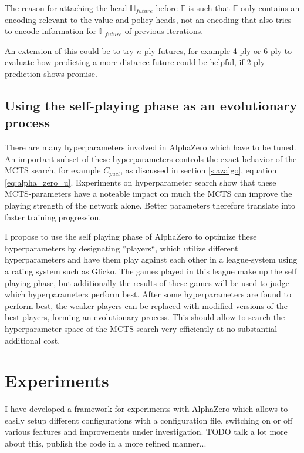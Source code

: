 \documentclass[12pt,onecolumn,oneside,titlepage]{article}
\begin{document}
The reason for attaching the head $\mathbb{H}_{future}$ before $\mathbb{F}$ is such that $\mathbb{F}$ only contains an encoding relevant to the value and policy heads, not an encoding that also tries to encode information for $\mathbb{H}_{future}$ of previous iterations.

An extension of this could be to try $n$-ply futures, for example 4-ply or 6-ply to evaluate how predicting a more distance future could be helpful, if 2-ply prediction shows promise.

\subsection{Using the self-playing phase as an evolutionary process}

There are many hyperparameters involved in AlphaZero which have to be tuned. An important subset of these hyperparameters controls the exact behavior of the MCTS search, for example $C_{puct}$, as discussed in section \ref{s:azalgo}, equation \ref{eq:alpha_zero_u}.
Experiments on hyperparameter search show that these MCTS-parameters have a noteable impact on much the MCTS can improve the playing strength of the network alone. Better parameters therefore translate into faster training progression.

I propose to use the self playing phase of AlphaZero to optimize these hyperparameters by designating ''players``, which utilize different hyperparameters and have them play against each other in a league-system using a rating system such as Glicko. The games played 
in this league make up the self playing phase, but additionally the results of these games will be used to judge which hyperparameters perform best. After some hyperparameters are found to perform best, the weaker players can be replaced with modified versions 
of the best players, forming an evolutionary process. This should allow to search the hyperparameter space of the MCTS search very efficiently at no substantial additional cost.


\section{Experiments} \label{s:experiments}

I have developed a framework for experiments with AlphaZero which allows to easily setup different configurations with a configuration file, switching on or off various features and improvements under investigation.
TODO talk a lot more about this, publish the code in a more refined manner...
\end{document}
